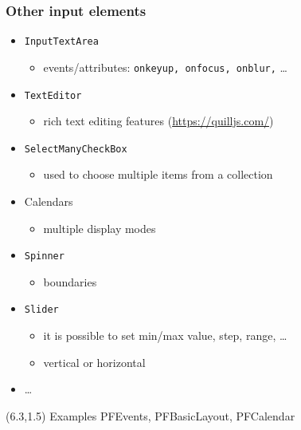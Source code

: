 \documentclass[10pt,xcolor=pdflatex]{beamer}
\begin{document}
\begin{frame}\frametitle{Other input elements}
  \begin{itemize}
    \item \texttt{InputTextArea}
	  \begin{itemize}
	    \item events/attributes: \texttt{onkeyup, onfocus, onblur,} \ldots
	  \end{itemize}
    \item \texttt{TextEditor}
      \begin{itemize}
        \item rich text editing features (\url{https://quilljs.com/})
      \end{itemize}
    \item \texttt{SelectManyCheckBox}
      \begin{itemize}
        \item used to choose multiple items from a collection
      \end{itemize}
    \item Calendars
	  \begin{itemize}
		\item multiple display modes
	  \end{itemize}
    \item \texttt{Spinner}
	  \begin{itemize}
		\item boundaries
	  \end{itemize}
    \item \texttt{Slider}
      \begin{itemize}
        \item it is possible to set min/max value, step, range, \ldots
        \item vertical or horizontal
      \end{itemize}
    \item \ldots
  \end{itemize}
\begin{textblock}{15}(6.3,1.5)
    {\footnotesize Examples PFEvents, PFBasicLayout, PFCalendar}
\end{textblock}
\end{frame}
\end{document}
